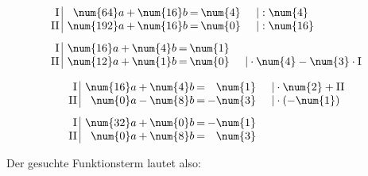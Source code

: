 \begin{exercise}
\begin{minipage}[t]{0.49\linewidth}
      \begin{alignat*}{1}
        &\setlength{\arraycolsep}{0.1em}%
        \begin{array}{r|rrrrrrrl}
         \text{I}{\,} & {\,} &  \num{64}a & + & \num{16}b & = & \num{4} & {\quad} & |:\num{4}  \\
        \text{II}{\,} & {\,} & \num{192}a & + & \num{16}b & = & \num{0} & {\quad} & |:\num{16}
        \end{array}
        \\[1ex]&\setlength{\arraycolsep}{0.1em}%
        \begin{array}{r|rrrrrrrl}
         \text{I}{\,} & {\,} & \num{16}a & + & \num{4}b & = & \num{1} & {\quad} &                                    \\
        \text{II}{\,} & {\,} & \num{12}a & + & \num{1}b & = & \num{0} & {\quad} & |\cdot\num{4}-\num{3}\cdot\text{I}
        \end{array}
      \end{alignat*}
    \end{minipage}%
    \hfill
    \begin{minipage}[t]{0.49\linewidth}
      \vspace*{-\abovedisplayskip}
      \begin{alignat*}{1}
        &\setlength{\arraycolsep}{0.1em}%
        \begin{array}{r|rrrrrrrl}
         \text{I}{\,} & {\,} & \num{16}a & + & \num{4}b & = &  \num{1} & {\quad} & |\cdot\num{2}+\text{II}     \\
        \text{II}{\,} & {\,} &  \num{0}a & - & \num{8}b & = & -\num{3} & {\quad} & |\cdot\left(-\num{1}\right)
        \end{array}
        \\[1ex]&\setlength{\arraycolsep}{0.1em}%
        \begin{array}{r|rrrrrrrl}
         \text{I}{\,} & {\,} & \num{32}a & + & \num{0}b & = & -\num{1} & {\quad} &   \\
        \text{II}{\,} & {\,} &  \num{0}a & + & \num{8}b & = &  \num{3} & {\quad} &
        \end{array}
      \end{alignat*}
    \end{minipage}\par
    Der gesuchte Funktionsterm lautet also:
    \begin{equation*}

\end{equation*}
\end{exercise}
